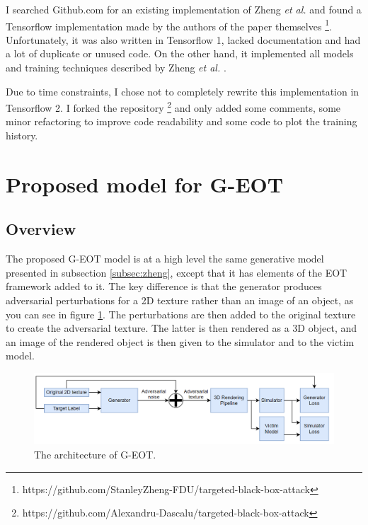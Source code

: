 I searched Github.com for an existing implementation of Zheng \textit{et al.} \cite{zheng_black_box_GAN} and found a Tensorflow implementation made by the authors of the paper themselves \footnote{https://github.com/StanleyZheng-FDU/targeted-black-box-attack}. Unfortunately, it was also written in Tensorflow 1, lacked documentation and had a lot of duplicate or unused code. On the other hand, it implemented all models and training techniques described by Zheng \textit{et al.} \cite{zheng_black_box_GAN}.

Due to time constraints, I chose not to completely rewrite this implementation in Tensorflow 2. I forked the repository \footnote{https://github.com/Alexandru-Dascalu/targeted-black-box-attack} and only added some comments, some minor refactoring to improve code readability and some code to plot the training history.

\section{Proposed model for G-EOT}
    \label{sec:proposed_model}
    
\subsection{Overview}
    \label{subsec:g_eot_overview}

The proposed G-EOT model is at a high level the same generative model presented in subsection \ref{subsec:zheng}, except that it has elements of the EOT framework \cite{athalye} added to it. The key difference is that the generator produces adversarial perturbations for a 2D texture rather than an image of an object, as you can see in figure \ref{fig:architecture}. The perturbations are then added to the original texture to create the adversarial texture. The latter is then rendered as a 3D object, and an image of the rendered object is then given to the simulator and to the victim model.

\begin{figure}[h]
    \centering
    \includegraphics[width=1\textwidth]{graphics/architecture.PNG}
    \caption{The architecture of G-EOT.}
    \label{fig:architecture}
\end{figure}

